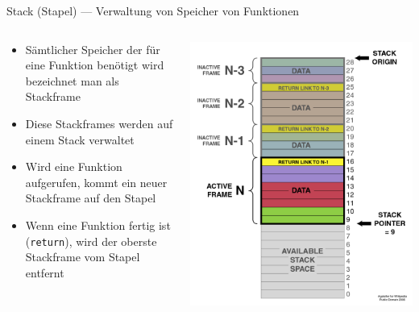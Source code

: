 \documentclass[presentation]{beamer}
\begin{document}
\begin{frame}[label={sec:org8231ffb},fragile]{Stack (Stapel) --- Verwaltung von Speicher von Funktionen}
 \begin{columns}
\begin{column}{0.5\columnwidth}
\begin{itemize}
\item Sämtlicher Speicher der für eine Funktion benötigt wird bezeichnet
man als \alert{Stackframe}
\item Diese Stackframes werden auf einem Stack verwaltet
\item Wird eine \alert{Funktion aufgerufen}, kommt ein \alert{neuer Stackframe auf den
Stapel}
\item Wenn eine \alert{Funktion fertig} ist ({\color{solarizedYellow}\texttt{return}}), wird der oberste
Stackframe vom Stapel \alert{entfernt}
\end{itemize}
\end{column}
\begin{column}{0.5\columnwidth}
\begin{center}\begin{center}
\includegraphics[width=.9\linewidth]{images/ProgramCallStack2_en.png}
\end{center}\end{center}
\end{column}
\end{columns}
\end{frame}
\end{document}
